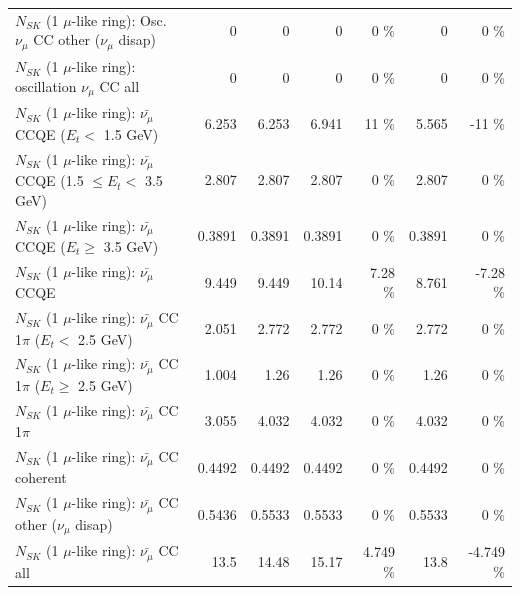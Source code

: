 \begin{table}
\begin{tabular}{| l | r | r | r  r | r  r |}
         $N_{SK}$ (1 $\mu$-like ring): Osc. $\nu_\mu$ CC other ($\nu_\mu$ disap) &               0 &               0 &               0 &        0 \%  &               0 &        0 \%  \\ 
                      $N_{SK}$ (1 $\mu$-like ring): oscillation $\nu_\mu$ CC all &               0 &               0 &               0 &        0 \%  &               0 &        0 \%  \\ 
\hline
\hline
          $N_{SK}$ (1 $\mu$-like ring): $\bar{\nu_\mu}$ CCQE ($E_{t} <$ 1.5 GeV) &           6.253 &           6.253 &           6.941 &       11 \%  &           5.565 &      -11 \%  \\ 
 $N_{SK}$ (1 $\mu$-like ring): $\bar{\nu_\mu}$ CCQE (1.5 $\leq E_{t} <$ 3.5 GeV) &           2.807 &           2.807 &           2.807 &        0 \%  &           2.807 &        0 \%  \\ 
       $N_{SK}$ (1 $\mu$-like ring): $\bar{\nu_\mu}$ CCQE ($E_{t} \geq$ 3.5 GeV) &          0.3891 &          0.3891 &          0.3891 &        0 \%  &          0.3891 &        0 \%  \\ 
\hline
                              $N_{SK}$ (1 $\mu$-like ring): $\bar{\nu_\mu}$ CCQE &           9.449 &           9.449 &           10.14 &     7.28 \%  &           8.761 &    -7.28 \%  \\ 
\hline
     $N_{SK}$ (1 $\mu$-like ring): $\bar{\nu_\mu}$ CC 1$\pi$ ($E_{t} <$ 2.5 GeV) &           2.051 &           2.772 &           2.772 &        0 \%  &           2.772 &        0 \%  \\ 
  $N_{SK}$ (1 $\mu$-like ring): $\bar{\nu_\mu}$ CC 1$\pi$ ($E_{t} \geq$ 2.5 GeV) &           1.004 &            1.26 &            1.26 &        0 \%  &            1.26 &        0 \%  \\ 
\hline
                         $N_{SK}$ (1 $\mu$-like ring): $\bar{\nu_\mu}$ CC 1$\pi$ &           3.055 &           4.032 &           4.032 &        0 \%  &           4.032 &        0 \%  \\ 
                       $N_{SK}$ (1 $\mu$-like ring): $\bar{\nu_\mu}$ CC coherent &          0.4492 &          0.4492 &          0.4492 &        0 \%  &          0.4492 &        0 \%  \\ 
        $N_{SK}$ (1 $\mu$-like ring): $\bar{\nu_\mu}$ CC other ($\nu_\mu$ disap) &          0.5436 &          0.5533 &          0.5533 &        0 \%  &          0.5533 &        0 \%  \\ 
                          $N_{SK}$ (1 $\mu$-like ring): $\bar{\nu_{\mu}}$ CC all &            13.5 &           14.48 &           15.17 &    4.749 \%  &            13.8 &   -4.749 \%  \\ 

\end{tabular}
\end{table}
